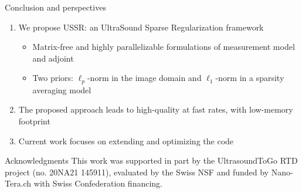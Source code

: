 {%
\begin{block}{Conclusion and perspectives}
	\begin{enumerate}
		\item We propose USSR: an UltraSound Sparse Regularization framework
		\begin{itemize}
			\item Matrix-free and highly parallelizable formulations of measurement model and adjoint
			\item Two priors: $\ell_p$-norm in the image domain and $\ell_1$-norm in a sparsity averaging model
		\end{itemize}
		\item The proposed approach leads to high-quality at fast rates, with low-memory footprint
		\item Current work focuses on extending and optimizing the code
	\end{enumerate}
\end{block}
\vfill
\begin{block}{Acknowledgments}
	This work was supported in part by the UltrasoundToGo RTD project (no. 20NA21 145911), evaluated by the Swiss NSF and funded by Nano-Tera.ch with Swiss Confederation financing.
\end{block}
}%
